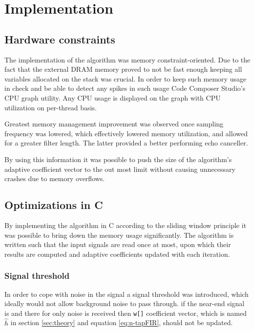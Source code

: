 \documentclass[a4paper,11pt,twoside]{article}
\begin{document}
\section{Implementation}
\subsection{Hardware constraints}
The implementation of the algorithm was memory constraint-oriented. Due to the fact that the external DRAM memory proved to not be fast enough keeping all variables allocated on the stack was crucial. In order to keep such memory usage in check and be able to detect any spikes in such usage Code Composer Studio's CPU graph utility. Any CPU usage is displayed on the graph with CPU utilization on per-thread basis.

Greatest memory management improvement was observed once sampling frequency was lowered, which effectively lowered memory utilization, and allowed for a greater filter length. The latter provided a better performing echo canceller.

By using this information it was possible to push the size of the algorithm's adaptive coefficient vector to the out most limit without causing unnecessary crashes due to memory overflows.

\subsection{Optimizations in C}
By implementing the algorithm in C according to the sliding window principle it was possible to bring down the memory usage significantly. The algorithm is written such that the input signals are read once at most, upon which their results are computed and adaptive coefficients updated with each iteration.

\subsubsection{Signal threshold}
In order to cope with noise in the signal a signal threshold was introduced, which ideally would not allow background noise to pass through. if the near-end signal is and there for only noise is received then \texttt{w[]} coefficient vector, which is named $\hat{h}$ in section \ref{sec:theory} and equation \ref{eq:n-tapFIR}, should not be updated.
\end{document}
